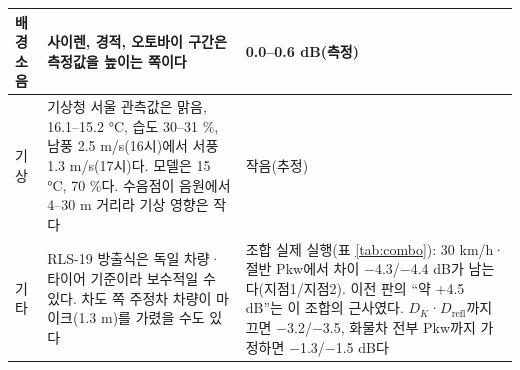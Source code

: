 \documentclass[10.5pt,a4paper]{article}
\begin{document}
\begin{longtable}{L{0.14}L{0.52}L{0.34}}
배경소음 & 사이렌, 경적, 오토바이 구간은 측정값을 높이는 쪽이다 & 0.0--0.6 dB(측정) \\ \midrule
기상 & 기상청 서울 관측값은 맑음, 16.1--15.2 °C, 습도 30--31 \%, 남풍 2.5 m/s(16시)에서 서풍 1.3 m/s(17시)다. 모델은 15 °C, 70 \%다. 수음점이 음원에서 4--30 m 거리라 기상 영향은 작다 & 작음(추정) \\ \midrule
기타 & RLS-19 방출식은 독일 차량·타이어 기준이라 보수적일 수 있다. 차도 쪽 주정차 차량이 마이크(1.3 m)를 가렸을 수도 있다 & 조합 실제 실행(표 \ref{tab:combo}): 30 km/h·절반 Pkw에서 차이 $-$4.3/$-$4.4 dB가 남는다(지점1/지점2). 이전 판의 ``약 +4.5 dB''는 이 조합의 근사였다. $D_K$·$D_{\mathrm{refl}}$까지 끄면 $-$3.2/$-$3.5, 화물차 전부 Pkw까지 가정하면 $-$1.3/$-$1.5 dB다 \\
\end{longtable}
\addtocounter{table}{-1}
\normalsize
\end{document}
